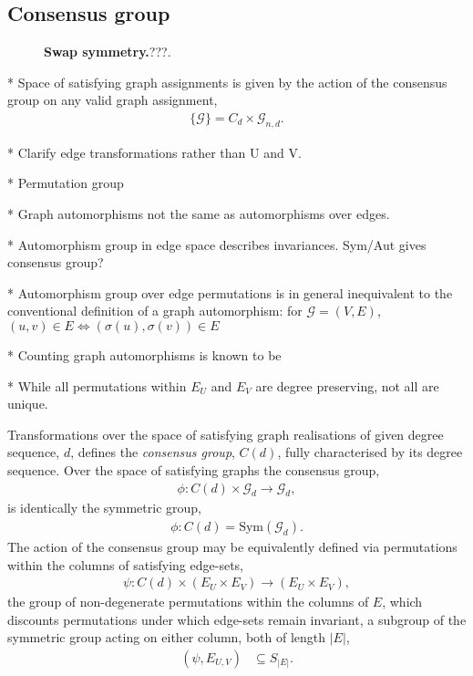 \subsection{Consensus group} \label{sec:assign_group}

\begin{figure}[!htb]
	\centering
	
	\caption{\textbf{Swap symmetry.}???.}\label{fig:swap_symmetry}
\end{figure}

* Space of satisfying graph assignments is given by the action of the consensus group on any valid graph assignment,
\begin{align}
	\{\mathcal{G}\} = C_d \times \mathcal{G}_{n,d}.
\end{align}

* Clarify edge transformations rather than U and V.

* Permutation group

* Graph automorphisms not the same as automorphisms over edges.

* Automorphism group in edge space describes invariances. Sym/Aut gives consensus group?

* Automorphism group over edge permutations is in general inequivalent to the conventional definition of a graph automorphism: for $\mathcal{G}=(V,E)$, $(u,v)\in E \Leftrightarrow (\sigma(u),\sigma(v))\in E$ %

* Counting graph automorphisms is known to be

* While all permutations within $E_U$ and $E_V$ are degree preserving, not all are unique.

Transformations over the space of satisfying graph realisations of given degree sequence, $d$, defines the \emph{consensus group}, $C(d)$, fully characterised by its degree sequence. Over the space of satisfying graphs the consensus group,
\begin{align}
	\phi: C(d)\times \mathcal{G}_d \to \mathcal{G}_d,
\end{align}
is identically the symmetric group,
\begin{align}
	\phi: C(d) = \mathrm{Sym}(\mathcal{G}_d).
\end{align}
The action of the consensus group may be equivalently defined via permutations within the columns of satisfying edge-sets,
\begin{align}
	\psi: C(d)\times (E_U\times E_V) \to (E_U\times E_V),
\end{align}
the group of non-degenerate permutations within the columns of $E$, which discounts permutations under which edge-sets remain invariant, a subgroup of the symmetric group acting on either column, both of length $|E|$,
\begin{align}
	(\psi, E_{U,V}) & \subseteq S_{|E|}.
\end{align}


